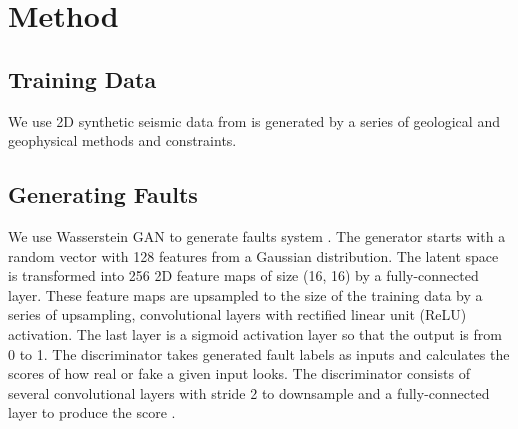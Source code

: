\section{Method}
\subsection{Training Data}
We use 2D synthetic seismic data from \cite{wusyn2020} is generated by a series of geological and geophysical methods and constraints.    

\subsection{Generating Faults}
We use Wasserstein GAN to generate faults system \cite[]{arjovsky2017}. The generator starts with a random vector with 128 features from a Gaussian distribution. The latent space is transformed into 256 2D feature maps of size (16, 16) by a fully-connected layer. These feature maps are upsampled to the size of the training data by a series of upsampling, convolutional layers with rectified linear unit (ReLU) activation. The last layer is a sigmoid activation layer so that the output is from 0 to 1. The discriminator takes generated  fault labels as inputs and calculates the scores of how real or fake a given input looks. The discriminator consists of several convolutional layers with stride 2 to downsample and a fully-connected layer to produce the score .

